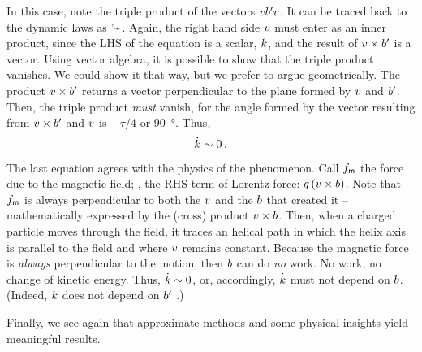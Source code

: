 In this case, note the triple product of the vectors $vb'v$. It can be traced back to the dynamic laws as
%
\beq
  \vel\mfield'\vel \sim {}\iprod\vel\,.
\eeq
%
Again, the right hand side $v$ must enter as an inner product, since the LHS of the equation is a scalar, $\dot{k}$, and the result of $v\times b'$ is a vector. Using vector algebra, it is possible to show that the triple product vanishes. We could show it that way, but we prefer to argue geometrically. The product $v\times b'$ returns a vector perpendicular to the plane formed by $v$ and $b'$. Then, the triple product \emph{must} vanish, for the angle formed by the vector resulting from $v\times b'$ and $v$ is
%
~
%
$\tau/4$ or \SI{90}{\degree}. Thus,
%
\begin{equation}\label{eq:kinenergymagneticfield}
  \dot{k} \sim 0\,.
\end{equation}

The last equation agrees with the physics of the phenomenon. Call $f_{\text{\sffamily m}}$ the force due to the magnetic field; \ie, the RHS term of Lorentz force: $q\left({v\times b}\right)$. Note that $f_{\text{\sffamily m}}$ is always perpendicular to both the $v$ and the $b$ that created it -- mathematically expressed by the (cross) product $v\times b$. Then, when a charged particle moves through the field, it traces an helical path in which the helix axis is parallel to the field and where $v$ remains constant. Because the magnetic force is \emph{always} perpendicular to the motion, then $b$ can do \emph{no} work. No work, no change of kinetic energy. Thus, $\dot{k}\sim 0$, or, accordingly, $\dot{k}$ must not depend on $b$. (Indeed, $\dot{k}$ does not depend on $b'$ \cite[p. 142]{tong:2013}.)

Finally, we see again that approximate methods and some physical insights yield meaningful results.


